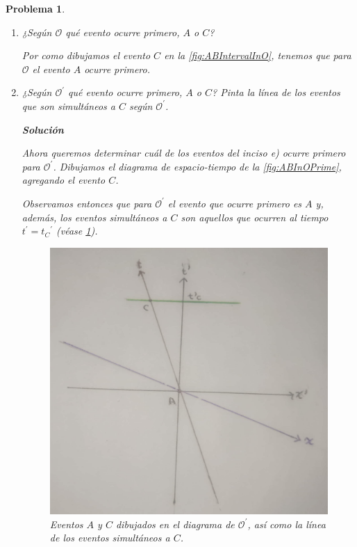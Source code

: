 \documentclass[12pt]{article}
\theoremstyle{break}
\newtheorem{exercise}{Problema}
\theoremstyle{nonumberbreak}
\newcommand*{\observer}{\mathcal{O}}
\newcommand*{\primeobserver}{\mathcal{O}^{\prime}}
\newcommand*{\inlinesol}{\vspace*{10pt}\textbf{Solución}\vspace*{10pt}}
\begin{document}
\begin{exercise}
\begin{enumerate}[label = \alph*)]
            \item ¿Según \(\observer\) qué evento ocurre primero, \(A\) o \(C\)?
            
            Por como dibujamos el evento \(C\) en la \cref{fig:ABIntervalInO}, tenemos que para \(\observer\) el evento \(A\) ocurre primero.

            \item ¿Según \(\primeobserver\) qué evento ocurre primero, \(A\) o \(C\)? Pinta la línea de los eventos que son simultáneos a \(C\) según \(\primeobserver\).
            
            \inlinesol

            Ahora queremos determinar cuál de los eventos del inciso e) ocurre primero para \(\primeobserver\). Dibujamos el diagrama de espacio-tiempo de la \cref{fig:ABInOPrime}, agregando el evento \(C\).

            Observamos entonces que para \(\primeobserver\) el evento que ocurre primero es \(A\) y, además, los eventos simultáneos a \(C\) son aquellos que ocurren al tiempo \(t^{\prime} = {t_{C}}^{\prime}\) (véase \cref{fig:ACInOPrime}).

            \begin{figure}[htb]
                \centering
                \includegraphics[scale = 0.15]{fig-2.6.pdf}
                \caption{Eventos \(A\) y \(C\) dibujados en el diagrama de \(\primeobserver\), así como la línea de los eventos simultáneos a \(C\).}
                \label{fig:ACInOPrime}
            \end{figure}


\end{enumerate}
\end{exercise}
\end{document}
